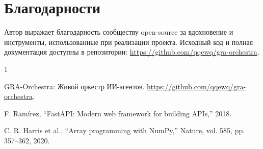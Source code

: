 \documentclass[twocolumn]{article}
\begin{document}
\section*{Благодарности}
Автор выражает благодарность сообществу open-source за вдохновение и инструменты, использованные при реализации проекта. Исходный код и полная документация доступны в репозитории: \url{https://github.com/qqewq/gra-orchestra}.


\begin{thebibliography}{1}

GRA-Orchestra: Живой оркестр ИИ-агентов. \url{https://github.com/qqewq/gra-orchestra}.

F. Ram\'irez, ``FastAPI: Modern web framework for building APIs,'' 2018.

C. R. Harris et al., ``Array programming with NumPy,'' Nature, vol. 585, pp. 357–362, 2020.

\end{thebibliography}
\end{document}
